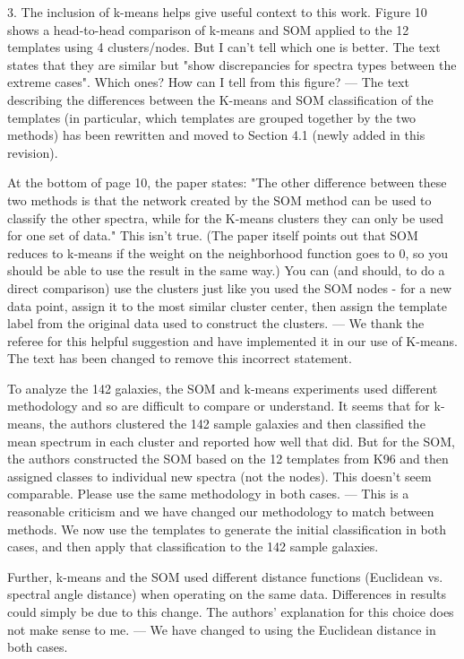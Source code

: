 3. The inclusion of k-means helps give useful context to this work. Figure 10 shows a head-to-head comparison of k-means and SOM applied to the 12 templates using 4 clusters/nodes.  But I can't tell which one is better.  The text states that they are similar but "show discrepancies for spectra types between the extreme cases".  Which ones?  How can I tell from this figure?
--- The text describing the differences between the K-means and SOM classification of the templates (in particular, which templates are grouped together by the two methods) has been rewritten and moved to Section 4.1 (newly added in this revision). 

At the bottom of page 10, the paper states: "The other difference between these two methods is that the network created by the SOM method can be used to classify the other spectra, while for the K-means clusters they can only be used for one set of data."  This isn't true.  (The paper itself points out that SOM reduces to k-means if the weight on the neighborhood function goes to 0, so you should be able to use the result in the same way.)  You can (and should, to do a direct comparison) use the clusters just like you used the SOM nodes - for a new data point, assign it to the most similar cluster center, then assign the template label from the original data used to construct the clusters.
--- We thank the referee for this helpful suggestion and have implemented it in our use of K-means. The text has been changed to remove this incorrect statement.

To analyze the 142 galaxies, the SOM and k-means experiments used different methodology and so are difficult to compare or understand. It seems that for k-means, the authors clustered the 142 sample galaxies and then classified the mean spectrum in each cluster and reported how well that did.  But for the SOM, the authors constructed the SOM based on the 12 templates from K96 and then assigned classes to individual new spectra (not the nodes).  This doesn't seem comparable.  Please use the same methodology in both cases.
--- This is a reasonable criticism and we have changed our methodology to match between methods. We now use the templates to generate the initial classification in both cases, and then apply that classification to the 142 sample galaxies.


Further, k-means and the SOM used different distance functions (Euclidean vs. spectral angle distance) when operating on the same data.  Differences in results could simply be due to this change.  The authors' explanation for this choice does not make sense to me.
--- We have changed to using the Euclidean distance in both cases.

